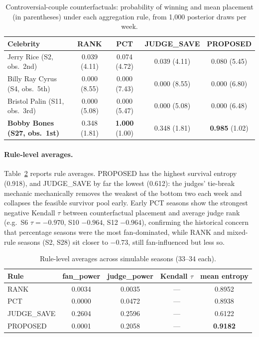 \documentclass[11pt]{article}
\begin{document}
\begin{table}[H]
\centering
\caption{Controversial-couple counterfactuals: probability of winning
and mean placement (in parentheses) under each aggregation rule, from
1{,}000 posterior draws per week.}
\label{tab:controversy}
\begin{tabular}{lcccc}
\toprule
Celebrity & RANK & PCT & JUDGE\_SAVE & PROPOSED \\
\midrule
Jerry Rice (S2, obs.\ 2nd) & 0.039 (4.11) & 0.074 (4.72) & 0.039 (4.11) & 0.080 (5.45) \\
Billy Ray Cyrus (S4, obs.\ 5th) & 0.000 (8.55) & 0.000 (7.43) & 0.000 (8.55) & 0.000 (6.80) \\
Bristol Palin (S11, obs.\ 3rd) & 0.000 (5.08) & 0.000 (5.47) & 0.000 (5.08) & 0.000 (6.48) \\
\textbf{Bobby Bones (S27, obs.\ 1st)} & 0.348 (1.81) & \textbf{1.000} (1.00) & 0.348 (1.81) & \textbf{0.985} (1.02) \\
\bottomrule
\end{tabular}
\end{table}

\paragraph{Rule-level averages.} Table~\ref{tab:ruleavg} reports rule
averages. PROPOSED has the highest survival entropy (0.918), and
JUDGE\_SAVE by far the lowest (0.612): the judges' tie-break mechanic
mechanically removes the weakest of the bottom two each week and
collapses the feasible survivor pool early. Early PCT seasons show the
strongest negative Kendall $\tau$ between counterfactual placement and
average judge rank (e.g.\ S6 $\tau = -0.970$, S10 $-0.964$, S12
$-0.964$), confirming the historical concern that percentage seasons
were the most fan-dominated, while RANK and mixed-rule seasons (S2,
S28) sit closer to $-0.73$, still fan-influenced but less so.

\begin{table}[H]
\centering
\caption{Rule-level averages across simulable seasons (33--34 each).}
\label{tab:ruleavg}
\begin{tabular}{lccc|c}
\toprule
Rule & fan\_power & judge\_power & Kendall $\tau$ & mean entropy \\
\midrule
RANK & 0.0034 & 0.0035 & --- & 0.8952 \\
PCT & 0.0000 & 0.0472 & --- & 0.8938 \\
JUDGE\_SAVE & 0.2604 & 0.2596 & --- & 0.6122 \\
PROPOSED & 0.0001 & 0.2058 & --- & \textbf{0.9182} \\
\bottomrule
\end{tabular}
\end{table}
\end{document}
